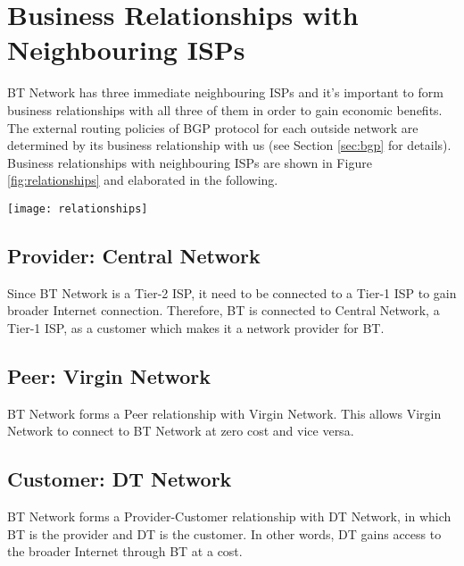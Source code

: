 \section{Business Relationships with Neighbouring ISPs}
\label{sec:relationships}

BT Network has three immediate neighbouring ISPs and it's important to form business relationships with all three of them in order to gain economic benefits. 
The external routing policies of BGP protocol for each outside network are determined by its business relationship with us (see Section \ref{sec:bgp} for details).
Business relationships with neighbouring ISPs are shown in Figure \ref{fig:relationships} and elaborated in the following.

\begin{figure*}[ht!]
    \centering
    \texttt{[image: relationships]}
    \caption{Business Relationships of BT Network with Neighbouring ISPs.}
    \label{fig:relationships}
\end{figure*}


\subsection{Provider: Central Network}
Since BT Network is a Tier-2 ISP, it need to be connected to a Tier-1 ISP to gain broader Internet connection. Therefore, BT is connected to Central Network, a Tier-1 ISP, as a customer which makes it a network provider for BT.

\subsection{Peer: Virgin Network}
BT Network forms a Peer relationship with Virgin Network. This allows Virgin Network to connect to BT Network at zero cost and vice versa.

\subsection{Customer: DT Network}
\label{sec:dt}
BT Network forms a Provider-Customer relationship with DT Network, in which BT is the provider and DT is the customer. In other words, DT gains access to the broader Internet through BT at a cost.
